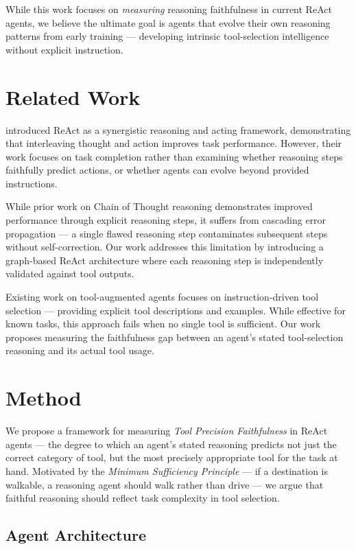 \documentclass{article}
\begin{document}
While this work focuses on \textit{measuring} reasoning faithfulness in current ReAct agents, we believe the ultimate goal is agents that evolve their own reasoning patterns from early training --- developing intrinsic tool-selection intelligence without explicit instruction.

\section{Related Work}

\citet{yao2022react} introduced ReAct as a synergistic reasoning and acting framework, demonstrating that interleaving thought and action improves task performance. However, their work focuses on task completion rather than examining whether reasoning steps faithfully predict actions, or whether agents can evolve beyond provided instructions.

While prior work on Chain of Thought reasoning \citep{wei2022chain} demonstrates improved performance through explicit reasoning steps, it suffers from cascading error propagation --- a single flawed reasoning step contaminates subsequent steps without self-correction. Our work addresses this limitation by introducing a graph-based ReAct architecture where each reasoning step is independently validated against tool outputs.

Existing work on tool-augmented agents \citep{schick2023toolformer,qin2023toolllm} focuses on instruction-driven tool selection --- providing explicit tool descriptions and examples. While effective for known tasks, this approach fails when no single tool is sufficient. Our work proposes measuring the faithfulness gap between an agent's stated tool-selection reasoning and its actual tool usage.

\section{Method}

We propose a framework for measuring \textit{Tool Precision Faithfulness} in ReAct agents --- the degree to which an agent's stated reasoning predicts not just the correct category of tool, but the most precisely appropriate tool for the task at hand. Motivated by the \textit{Minimum Sufficiency Principle} --- if a destination is walkable, a reasoning agent should walk rather than drive --- we argue that faithful reasoning should reflect task complexity in tool selection.

\subsection{Agent Architecture}
\end{document}
